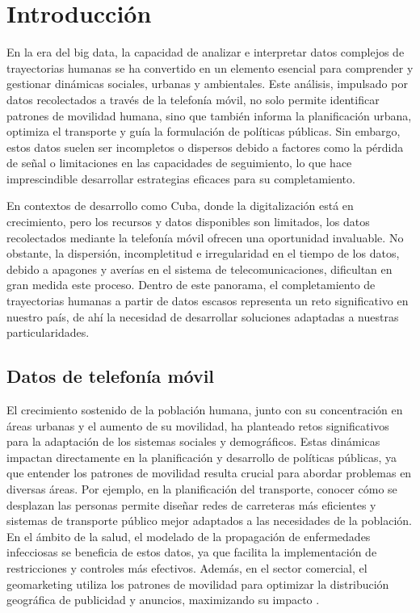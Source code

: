 \chapter*{Introducción}\label{chapter:introduction}

En la era del big data, la capacidad de analizar e interpretar datos complejos de trayectorias humanas se ha convertido en un elemento esencial para comprender y gestionar dinámicas sociales, urbanas y ambientales. Este análisis, impulsado por datos recolectados a través de la telefonía móvil, no solo permite identificar patrones de movilidad humana, sino que también informa la planificación urbana, optimiza el transporte y guía la formulación de políticas públicas. Sin embargo, estos datos suelen ser incompletos o dispersos debido a factores como la pérdida de señal o limitaciones en las capacidades de seguimiento, lo que hace imprescindible desarrollar estrategias eficaces para su completamiento.

En contextos de desarrollo como Cuba, donde la digitalización está en crecimiento, pero los recursos y datos disponibles son limitados, los datos recolectados mediante la telefonía móvil ofrecen una oportunidad invaluable. No obstante, la dispersión, incompletitud e irregularidad en el tiempo de los datos, debido a apagones y averías en el sistema de telecomunicaciones, dificultan en gran medida este proceso. Dentro de este panorama, el completamiento de trayectorias humanas a partir de datos escasos representa un reto significativo en nuestro país, de ahí la necesidad de desarrollar soluciones adaptadas a nuestras particularidades.

\section*{Datos de telefonía móvil}

El crecimiento sostenido de la población humana, junto con su concentración en áreas urbanas y el aumento de su movilidad, ha planteado retos significativos para la adaptación de los sistemas sociales y demográficos. Estas dinámicas impactan directamente en la planificación y desarrollo de políticas públicas, ya que entender los patrones de movilidad resulta crucial para abordar problemas en diversas áreas. Por ejemplo, en la planificación del transporte, conocer cómo se desplazan las personas permite diseñar redes de carreteras más eficientes y sistemas de transporte público mejor adaptados a las necesidades de la población. En el ámbito de la salud, el modelado de la propagación de enfermedades infecciosas se beneficia de estos datos, ya que facilita la implementación de restricciones y controles más efectivos. Además, en el sector comercial, el geomarketing utiliza los patrones de movilidad para optimizar la distribución geográfica de publicidad y anuncios, maximizando su impacto \cite{asgari2013survey}.

